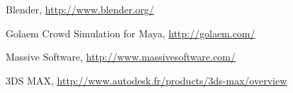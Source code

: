 \documentclass[a4paper,12pt]{article}
\begin{document}
\newpage

\begin{thebibliography}{}

  Blender,
  \url{http://www.blender.org/}


  Golaem Crowd Simulation for Maya,
  \url{http://golaem.com/}


  Massive Software,
  \url{http://www.massivesoftware.com/}


  3DS MAX,
  \url{http://www.autodesk.fr/products/3ds-max/overview}

\end{thebibliography}
\end{document}
